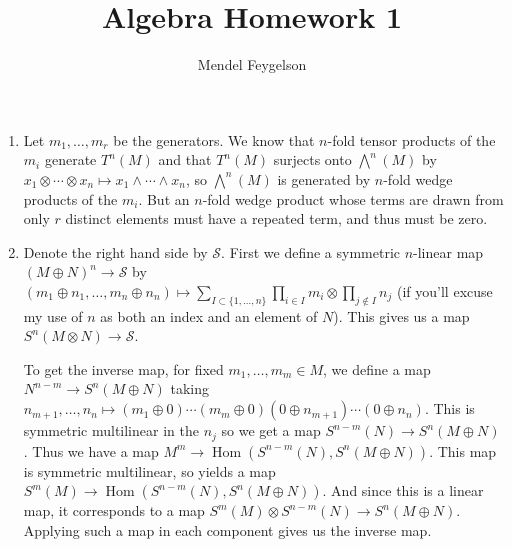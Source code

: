 \documentclass{article}
\title{Algebra Homework 1}
\author{Mendel Feygelson}
\renewcommand\S{\mathcal S}
\DeclareMathOperator\Hom{Hom}
\begin{document}
\maketitle
\begin{enumerate}

  \item Let $m_1,\dotsc,m_r$ be the generators. We know that $n$-fold tensor
     products of the $m_i$ generate $T^n(M)$ and that $T^n(M)$ surjects onto
     $\bigwedge^n(M)$ by $x_1\otimes\dotsb\otimes x_n \mapsto
     x_1\wedge\dotsb\wedge x_n$, so $\bigwedge^n(M)$ is generated by $n$-fold
     wedge products of the $m_i$. But an $n$-fold wedge product whose terms are
     drawn from only $r$ distinct elements must have a repeated term, and thus
     must be zero.

  \item Denote the right hand side by $\S$. First we define a symmetric
     $n$-linear map $(M \oplus N)^n \to \S$ by $(m_1 \oplus n_1,\dotsc,m_n
     \oplus n_n) \mapsto \sum_{I \subset \{1,\dotsc,n\}} \prod_{i \in I} m_i
     \otimes \prod_{j \not\in I} n_j$ (if you'll excuse my use of $n$ as both an
     index and an element of $N$). This gives us a map $S^n(M \otimes N) \to
     \S$. 
     
     To get the inverse map, for fixed $m_1,\dotsc,m_m \in M$, we define a map
     $N^{n-m} \to S^n(M \oplus N)$ taking $n_{m+1},\dotsc,n_n \mapsto (m_1
     \oplus 0)\dotsm(m_m \oplus 0)(0 \oplus n_{m+1})\dotsm(0 \oplus n_n)$. This
     is symmetric multilinear in the $n_j$ so we get a map $S^{n-m}(N) \to S^n(M
     \oplus N)$. Thus we have a map $M^m \to \Hom(S^{n-m}(N), S^n(M \oplus N))$.
     This map is symmetric multilinear, so yields a map $S^m(M) \to
     \Hom(S^{n-m}(N), S^n(M \oplus N))$. And since this is a linear map, it
     corresponds to a map $S^m(M) \otimes S^{n-m}(N) \to S^n(M \oplus N)$.
     Applying such a map in each component gives us the inverse map.


\end{enumerate}
\end{document}
